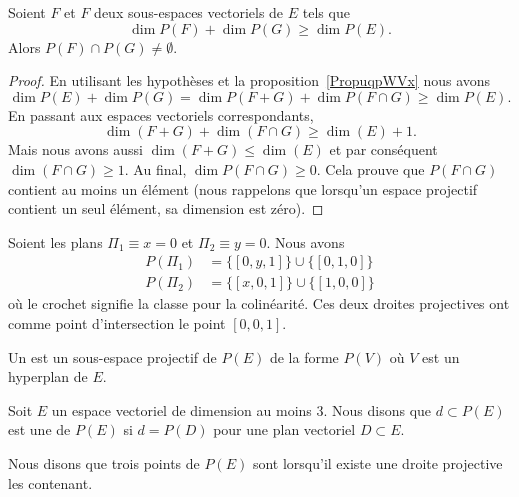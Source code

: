 \begin{theorem}[incidence]
	Soient \( F\) et \( F\) deux sous-espaces vectoriels de \( E\) tels que
	\begin{equation}
		\dim P(F)+\dim P(G)\geq \dim P(E).
	\end{equation}
	Alors \( P(F)\cap P(G)\neq \emptyset\).
\end{theorem}

\begin{proof}
	En utilisant les hypothèses et la proposition~\ref{PropuqpWVx} nous avons
	\begin{equation}
		\dim P(E)+\dim P(G)=\dim P(F+G)+\dim P(F\cap G)\geq \dim P(E).
	\end{equation}
	En passant aux espaces vectoriels correspondants,
	\begin{equation}
		\dim(F+G)+\dim(F\cap G)\geq \dim(E)+1.
	\end{equation}
	Mais nous avons aussi \( \dim(F+G)\leq \dim(E)\) et par conséquent \( \dim(F\cap G)\geq 1\). Au final, \( \dim P(F\cap G)\geq 0\). Cela prouve que \( P(F\cap G)\) contient au moins un élément (nous rappelons que lorsqu'un espace projectif contient un seul élément, sa dimension est zéro).
\end{proof}

\begin{example}
	Soient les plans \( \Pi_1\equiv x=0\) et \( \Pi_2\equiv y=0\). Nous avons
	\begin{subequations}
		\begin{align}
			P(\Pi_1) & =\{ [0,y,1] \}\cup\{ [0,1,0] \} \\
			P(\Pi_2) & =\{ [x,0,1] \}\cup\{ [1,0,0] \}
		\end{align}
	\end{subequations}
	où le crochet signifie la classe pour la colinéarité. Ces deux droites projectives ont comme point d'intersection le point \( [0,0,1]\).
\end{example}

\begin{definition}
	Un  est un sous-espace projectif de \( P(E)\) de la forme \( P(V)\) où \( V\) est un hyperplan de \( E\).
\end{definition}

\begin{definition}      \label{DEFooBBMBooSVgTnn}
	Soit \( E\) un espace vectoriel de dimension au moins \( 3\). Nous disons que \( d\subset P(E)\) est une  de \( P(E)\) si \( d=P(D)\) pour une plan vectoriel \( D\subset E\).

	Nous disons que trois points de \( P(E)\) sont  lorsqu'il existe une droite projective les contenant.
\end{definition}

